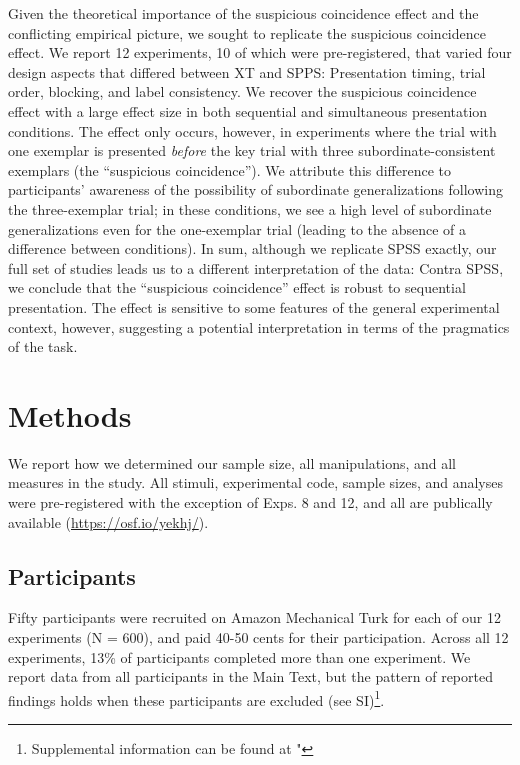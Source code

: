 \documentclass[english,floatsintext,man]{apa6}
\theoremstyle{definition}
\theoremstyle{definition}
\theoremstyle{remark}
\begin{document}
Given the theoretical importance of the suspicious coincidence effect
and the conflicting empirical picture, we sought to replicate the
suspicious coincidence effect. We report 12 experiments, 10 of which
were pre-registered, that varied four design aspects that differed
between XT and SPPS: Presentation timing, trial order, blocking, and
label consistency. We recover the suspicious coincidence effect with a
large effect size in both sequential and simultaneous presentation
conditions. The effect only occurs, however, in experiments where the
trial with one exemplar is presented \emph{before} the key trial with
three subordinate-consistent exemplars (the \enquote{suspicious
coincidence}). We attribute this difference to participants' awareness
of the possibility of subordinate generalizations following the
three-exemplar trial; in these conditions, we see a high level of
subordinate generalizations even for the one-exemplar trial (leading to
the absence of a difference between conditions). In sum, although we
replicate SPSS exactly, our full set of studies leads us to a different
interpretation of the data: Contra SPSS, we conclude that the
\enquote{suspicious coincidence} effect is robust to sequential
presentation. The effect is sensitive to some features of the general
experimental context, however, suggesting a potential interpretation in
terms of the pragmatics of the task.

\section{Methods}\label{methods}

We report how we determined our sample size, all manipulations, and all
measures in the study. All stimuli, experimental code, sample sizes, and
analyses were pre-registered with the exception of Exps. 8 and 12, and
all are publically available (\url{https://osf.io/yekhj/}).

\subsection{Participants}\label{participants}

Fifty participants were recruited on Amazon Mechanical Turk for each of
our 12 experiments (N = 600), and paid 40-50 cents for their
participation. Across all 12 experiments, 13\% of participants completed
more than one experiment. We report data from all participants in the
Main Text, but the pattern of reported findings holds when these
participants are excluded (see
SI)\footnote{Supplemental information can be found at "}.
\end{document}
